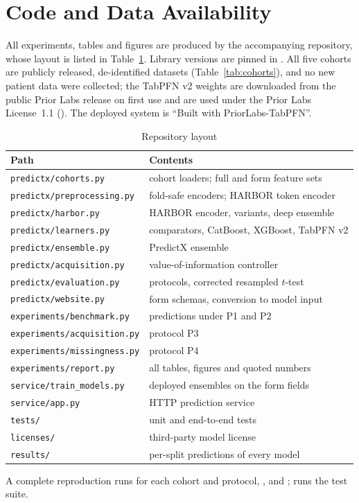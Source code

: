 \section{Code and Data Availability}\label{sec:code}
All experiments, tables and figures are produced by the accompanying repository, whose layout is listed in Table~\ref{tab:repo}. Library versions are pinned in . All five cohorts are publicly released, de-identified datasets (Table~\ref{tab:cohorts}), and no new patient data were collected; the TabPFN v2 weights are downloaded from the public Prior Labs release on first use and are used under the Prior Labs License~1.1 (). The deployed system is ``Built with PriorLabs-TabPFN''.

\begin{table}[!t]
\caption{Repository layout}
\label{tab:repo}
\centering\scriptsize
\setlength{\tabcolsep}{3pt}
\begin{tabular}{@{}ll@{}}
\toprule
Path & Contents\\
\midrule
\texttt{predictx/cohorts.py} & cohort loaders; full and form feature sets\\
\texttt{predictx/preprocessing.py} & fold-safe encoders; HARBOR token encoder\\
\texttt{predictx/harbor.py} & HARBOR encoder, variants, deep ensemble\\
\texttt{predictx/learners.py} & comparators, CatBoost, XGBoost, TabPFN v2\\
\texttt{predictx/ensemble.py} & PredictX ensemble\\
\texttt{predictx/acquisition.py} & value-of-information controller\\
\texttt{predictx/evaluation.py} & protocols, corrected resampled $t$-test\\
\texttt{predictx/website.py} & form schemas, conversion to model input\\
\texttt{experiments/benchmark.py} & predictions under P1 and P2\\
\texttt{experiments/acquisition.py} & protocol P3\\
\texttt{experiments/missingness.py} & protocol P4\\
\texttt{experiments/report.py} & all tables, figures and quoted numbers\\
\texttt{service/train\_models.py} & deployed ensembles on the form fields\\
\texttt{service/app.py} & HTTP prediction service\\
\texttt{tests/} & unit and end-to-end tests\\
\texttt{licenses/} & third-party model license\\
\texttt{results/} & per-split predictions of every model\\
\bottomrule
\end{tabular}
\end{table}

\noindent A complete reproduction runs  for each cohort and protocol, ,  and ;  runs the test suite.
